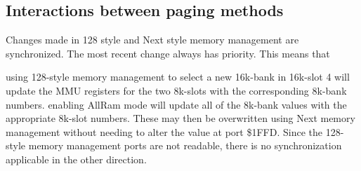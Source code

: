 



\subsection{Interactions between paging methods}

Changes made in 128 style and Next style memory management are
synchronized. The most recent change always has priority. This means
that

using 128-style memory management to select a new 16k-bank in 16k-slot
4 will update the MMU registers for the two 8k-slots with the
corresponding 8k-bank numbers.  enabling AllRam mode will update all
of the 8k-bank values with the appropriate 8k-slot numbers. These may
then be overwritten using Next memory management without needing to
alter the value at port \$1FFD.  Since the 128-style memory management
ports are not readable, there is no synchronization applicable in the
other direction.
